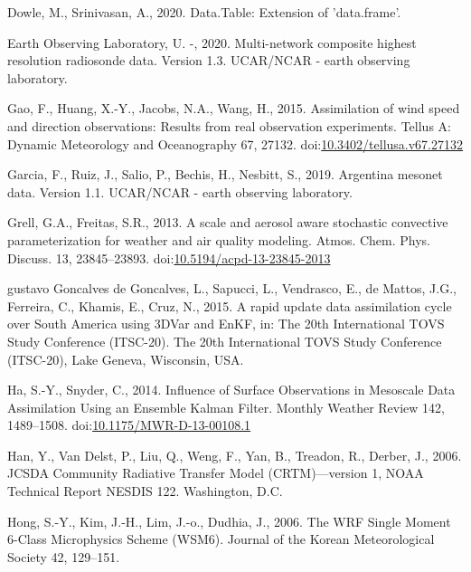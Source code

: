 \documentclass[final,5p,times,twocolumn,authoryear]{elsarticle} %
\begin{document}
\leavevmode\hypertarget{ref-dowle2020}{}%
Dowle, M., Srinivasan, A., 2020. Data.Table: Extension of 'data.frame'.

\leavevmode\hypertarget{ref-sondeos}{}%
Earth Observing Laboratory, U. -, 2020. Multi-network composite highest resolution radiosonde data. Version 1.3. UCAR/NCAR - earth observing laboratory.

\leavevmode\hypertarget{ref-gao2015}{}%
Gao, F., Huang, X.-Y., Jacobs, N.A., Wang, H., 2015. Assimilation of wind speed and direction observations: Results from real observation experiments. Tellus A: Dynamic Meteorology and Oceanography 67, 27132. doi:\href{https://doi.org/10.3402/tellusa.v67.27132}{10.3402/tellusa.v67.27132}

\leavevmode\hypertarget{ref-garcia2019}{}%
Garcia, F., Ruiz, J., Salio, P., Bechis, H., Nesbitt, S., 2019. Argentina mesonet data. Version 1.1. UCAR/NCAR - earth observing laboratory.

\leavevmode\hypertarget{ref-grell2013}{}%
Grell, G.A., Freitas, S.R., 2013. A scale and aerosol aware stochastic convective parameterization for weather and air quality modeling. Atmos. Chem. Phys. Discuss. 13, 23845--23893. doi:\href{https://doi.org/10.5194/acpd-13-23845-2013}{10.5194/acpd-13-23845-2013}

\leavevmode\hypertarget{ref-goncalvesdegoncalves2015}{}%
gustavo Goncalves de Goncalves, L., Sapucci, L., Vendrasco, E., de Mattos, J.G., Ferreira, C., Khamis, E., Cruz, N., 2015. A rapid update data assimilation cycle over South America using 3DVar and EnKF, in: The 20th International TOVS Study Conference (ITSC-20). The 20th International TOVS Study Conference (ITSC-20), Lake Geneva, Wisconsin, USA.

\leavevmode\hypertarget{ref-ha2014}{}%
Ha, S.-Y., Snyder, C., 2014. Influence of Surface Observations in Mesoscale Data Assimilation Using an Ensemble Kalman Filter. Monthly Weather Review 142, 1489--1508. doi:\href{https://doi.org/10.1175/MWR-D-13-00108.1}{10.1175/MWR-D-13-00108.1}

\leavevmode\hypertarget{ref-han2006}{}%
Han, Y., Van Delst, P., Liu, Q., Weng, F., Yan, B., Treadon, R., Derber, J., 2006. JCSDA Community Radiative Transfer Model (CRTM)---version 1, NOAA Technical Report NESDIS 122. Washington, D.C.

\leavevmode\hypertarget{ref-hong2006a}{}%
Hong, S.-Y., Kim, J.-H., Lim, J.-o., Dudhia, J., 2006. The WRF Single Moment 6-Class Microphysics Scheme (WSM6). Journal of the Korean Meteorological Society 42, 129--151.
\end{document}
